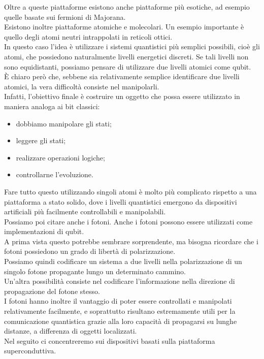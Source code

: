 Oltre a queste piattaforme esistono anche piattaforme più esotiche, ad esempio quelle basate sui fermioni di Majorana.\\
Esistono inoltre piattaforme atomiche e molecolari. Un esempio importante è quello degli atomi neutri intrappolati in reticoli ottici.\\
In questo caso l'idea è utilizzare i sistemi quantistici più semplici possibili, cioè gli atomi, che possiedono naturalmente livelli energetici discreti. Se tali livelli non sono equidistanti, possiamo pensare di utilizzare due livelli atomici come qubit.\\
È chiaro però che, sebbene sia relativamente semplice identificare due livelli atomici, la vera difficoltà consiste nel manipolarli.\\
Infatti, l'obiettivo finale è costruire un oggetto che possa essere utilizzato in maniera analoga ai bit classici:
\begin{itemize}[leftmargin=0.5cm]
    \item dobbiamo manipolare gli stati;
    \item leggere gli stati;
    \item realizzare operazioni logiche;
    \item controllarne l'evoluzione.
\end{itemize}
Fare tutto questo utilizzando singoli atomi è molto più complicato rispetto a una piattaforma a stato solido, dove i livelli quantistici emergono da dispositivi artificiali più facilmente controllabili e manipolabili.\\
Possiamo poi citare anche i fotoni. Anche i fotoni possono essere utilizzati come implementazioni di qubit.\\
A prima vista questo potrebbe sembrare sorprendente, ma bisogna ricordare che i fotoni possiedono un grado di libertà di polarizzazione.\\
Possiamo quindi codificare un sistema a due livelli nella polarizzazione di un singolo fotone propagante lungo un determinato cammino.\\
Un'altra possibilità consiste nel codificare l'informazione nella direzione di propagazione del fotone stesso.\\
I fotoni hanno inoltre il vantaggio di poter essere controllati e manipolati relativamente facilmente, e soprattutto risultano estremamente utili per la comunicazione quantistica grazie alla loro capacità di propagarsi su lunghe distanze, a differenza di oggetti localizzati.\\
Nel seguito ci concentreremo sui dispositivi basati sulla piattaforma superconduttiva.\\
